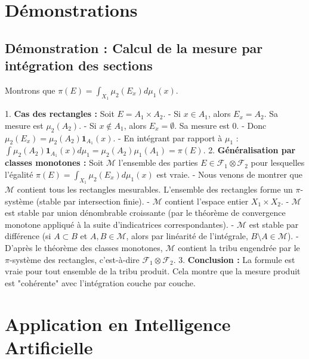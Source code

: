\documentclass[11pt,a4paper]{article}
\begin{document}
\section{Démonstrations}

\subsection{Démonstration : Calcul de la mesure par intégration des sections}

Montrons que $\pi(E) = \int_{X_1} \mu_2(E_x) d\mu_1(x)$.

1. \textbf{Cas des rectangles :} Soit $E = A_1 \times A_2$.
   - Si $x \in A_1$, alors $E_x = A_2$. Sa mesure est $\mu_2(A_2)$.
   - Si $x \notin A_1$, alors $E_x = \emptyset$. Sa mesure est 0.
   - Donc $\mu_2(E_x) = \mu_2(A_2) \mathbf{1}_{A_1}(x)$.
   - En intégrant par rapport à $\mu_1$ : $\int \mu_2(A_2) \mathbf{1}_{A_1}(x) d\mu_1 = \mu_2(A_2) \mu_1(A_1) = \pi(E)$.
2. \textbf{Généralisation par classes monotones :}
   Soit $\mathcal{M}$ l'ensemble des parties $E \in \mathcal{F}_1 \otimes \mathcal{F}_2$ pour lesquelles l'égalité $\pi(E) = \int_{X_1} \mu_2(E_x) d\mu_1(x)$ est vraie.
   - Nous venons de montrer que $\mathcal{M}$ contient tous les rectangles mesurables. L'ensemble des rectangles forme un $\pi$-système (stable par intersection finie).
   - $\mathcal{M}$ contient l'espace entier $X_1 \times X_2$.
   - $\mathcal{M}$ est stable par union dénombrable croissante (par le théorème de convergence monotone appliqué à la suite d'indicatrices correspondantes).
   - $\mathcal{M}$ est stable par différence (si $A \subset B$ et $A, B \in \mathcal{M}$, alors par linéarité de l'intégrale, $B \setminus A \in \mathcal{M}$).
   - D'après le théorème des classes monotones, $\mathcal{M}$ contient la tribu engendrée par le $\pi$-système des rectangles, c'est-à-dire $\mathcal{F}_1 \otimes \mathcal{F}_2$.
3. \textbf{Conclusion :} La formule est vraie pour tout ensemble de la tribu produit. Cela montre que la mesure produit est "cohérente" avec l'intégration couche par couche.





\section{Application en Intelligence Artificielle}
\end{document}

